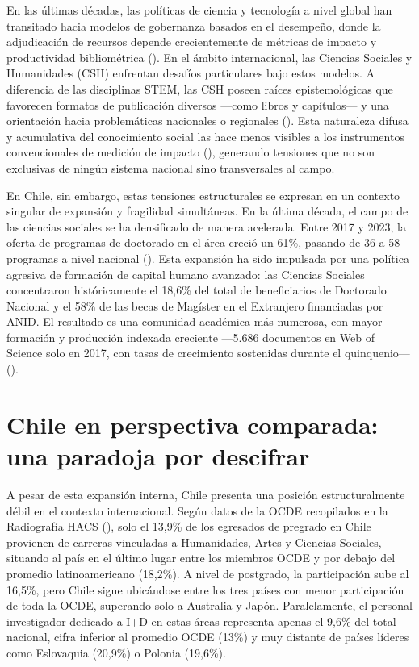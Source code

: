 \documentclass[
  spanish,
  a4paper,
  oneside]{scrbook}
\begin{document}
En las últimas décadas, las políticas de ciencia y tecnología a nivel
global han transitado hacia modelos de gobernanza basados en el
desempeño, donde la adjudicación de recursos depende crecientemente de
métricas de impacto y productividad bibliométrica
().
En el ámbito internacional, las Ciencias Sociales y Humanidades (CSH)
enfrentan desafíos particulares bajo estos modelos. A diferencia de las
disciplinas STEM, las CSH poseen raíces epistemológicas que favorecen
formatos de publicación diversos ---como libros y capítulos--- y una
orientación hacia problemáticas nacionales o regionales
(). Esta
naturaleza difusa y acumulativa del conocimiento social las hace menos
visibles a los instrumentos convencionales de medición de impacto
(), generando
tensiones que no son exclusivas de ningún sistema nacional sino
transversales al campo.

En Chile, sin embargo, estas tensiones estructurales se expresan en un
contexto singular de expansión y fragilidad simultáneas. En la última
década, el campo de las ciencias sociales se ha densificado de manera
acelerada. Entre 2017 y 2023, la oferta de programas de doctorado en el
área creció un 61\%, pasando de 36 a 58 programas a nivel nacional
(). Esta
expansión ha sido impulsada por una política agresiva de formación de
capital humano avanzado: las Ciencias Sociales concentraron
históricamente el 18,6\% del total de beneficiarios de Doctorado
Nacional y el 58\% de las becas de Magíster en el Extranjero financiadas
por ANID. El resultado es una comunidad académica más numerosa, con
mayor formación y producción indexada creciente ---5.686 documentos en
Web of Science solo en 2017, con tasas de crecimiento sostenidas durante
el quinquenio--- ().

\section{Chile en perspectiva comparada: una paradoja por
descifrar}\label{chile-en-perspectiva-comparada-una-paradoja-por-descifrar}

A pesar de esta expansión interna, Chile presenta una posición
estructuralmente débil en el contexto internacional. Según datos de la
OCDE recopilados en la Radiografía HACS
(), solo el
13,9\% de los egresados de pregrado en Chile provienen de carreras
vinculadas a Humanidades, Artes y Ciencias Sociales, situando al país en
el último lugar entre los miembros OCDE y por debajo del promedio
latinoamericano (18,2\%). A nivel de postgrado, la participación sube al
16,5\%, pero Chile sigue ubicándose entre los tres países con menor
participación de toda la OCDE, superando solo a Australia y Japón.
Paralelamente, el personal investigador dedicado a I+D en estas áreas
representa apenas el 9,6\% del total nacional, cifra inferior al
promedio OCDE (13\%) y muy distante de países líderes como Eslovaquia
(20,9\%) o Polonia (19,6\%).
\end{document}
